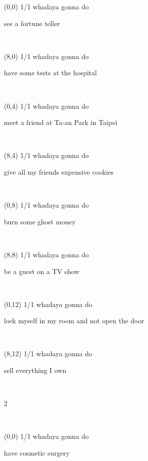 \documentclass[a4paper]{article}
\newcommand{\mycard}[5]{%
	\vspace{0.1cm}
	\small #1 #2
	\par
	\parbox[t][6.7cm][c]{9.5cm}{%
	\hspace{0.1cm} \Large#3\\
	\normalsize#4 #5
	}
}
\begin{document}
\begin{textblock}{8}(0,0)
\mycard{1/1}{whadaya gonna do}{\parbox{9.0cm}{
see a fortune teller
}}{}{} 
\end{textblock}

\begin{textblock}{8}(8,0)
\mycard{1/1}{whadaya gonna do}{\parbox{9.0cm}{
have some tests at the hospital
}}{}{} 
\end{textblock}

\begin{textblock}{8}(0,4)
\mycard{1/1}{whadaya gonna do}{\parbox{9.0cm}{
meet a friend at Ta-an Park in Taipei
}}{}{} 
\end{textblock}

\begin{textblock}{8}(8,4)
\mycard{1/1}{whadaya gonna do}{\parbox{9.0cm}{
give all my friends expensive cookies
}}{}{} 
\end{textblock}

\begin{textblock}{8}(0,8)
\mycard{1/1}{whadaya gonna do}{\parbox{9.0cm}{
burn some ghost money
}}{}{} 
\end{textblock}

\begin{textblock}{8}(8,8)
\mycard{1/1}{whadaya gonna do}{\parbox{9.0cm}{
be a guest on a TV show
}}{}{} 
\end{textblock}

\begin{textblock}{8}(0,12)
\mycard{1/1}{whadaya gonna do}{\parbox{9.0cm}{
lock myself in my room and not open the door
}}{}{} 
\end{textblock}

\begin{textblock}{8}(8,12)
\mycard{1/1}{whadaya gonna do}{\parbox{9.0cm}{
sell everything I own
}}{}{} 
\end{textblock}

\begin{tiny}2\end{tiny}\\
\newpage

\begin{textblock}{8}(0,0)
\mycard{1/1}{whadaya gonna do}{\parbox{9.0cm}{
have cosmetic surgery
}}{}{} 
\end{textblock}
\end{document}
